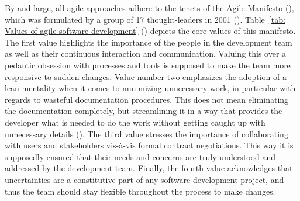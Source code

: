 By and large, all agile approaches adhere to the tenets of the Agile Manifesto (\cite*{AgileManifesto2001}), which was formulated by a group of 17 thought-leaders in 2001 (\cite{Rigby2016a}). Table~\ref{tab: Values of agile software development} (\cite{Dingsoyr2012}) depicts the core values of this manifesto. The first value highlights the importance of the people in the development team as well as their continuous interaction and communication. Valuing this over a pedantic obsession with processes and tools is supposed to make the team more responsive to sudden changes. Value number two emphasizes the adoption of a lean mentality when it comes to minimizing unnecessary work, in particular with regards to wasteful documentation procedures. This does not mean eliminating the documentation completely, but streamlining it in a way that provides the developer what is needed to do the work without getting caught up with unnecessary details (\cite{Eby2016}). The third value stresses the importance of collaborating with users and stakeholders vis-à-vis formal contract negotiations. This way it is supposedly ensured that their needs and concerns are truly understood and addressed by the development team. Finally, the fourth value acknowledges that uncertainties are a constitutive part of any software development project, and thus the team should stay flexible throughout the process to make changes.

\begin{wrapfigure}[8]{r}{0.6\textwidth}
	\centering
	\texttt{[image: \{"Latex/THESIS/Figures/Agile"]}.png}
	\caption[Agile development process]{Agile development process (Author's visualisation)}
	\label{fig:Agile development process}
\end{wrapfigure}

